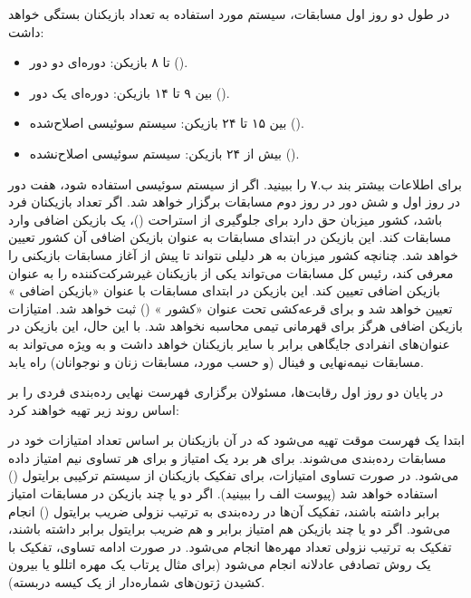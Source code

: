 
در طول دو روز اول مسابقات، سیستم مورد استفاده به تعداد بازیکنان بستگی خواهد داشت:

\begin{itemize}
  \item تا ۸ بازیکن: دوره‌ای دو دور ().
  \item بین ۹ تا ۱۴ بازیکن: دوره‌ای یک دور ().
  \item بین ۱۵ تا ۲۴ بازیکن: سیستم سوئیسی اصلاح‌شده ().
  \item بیش از ۲۴ بازیکن: سیستم سوئیسی اصلاح‌نشده ().
\end{itemize}

برای اطلاعات بیشتر بند ب.۷ را ببینید. اگر از سیستم سوئیسی استفاده شود، هفت دور در روز اول و شش دور در روز دوم مسابقات برگزار خواهد شد. اگر تعداد بازیکنان فرد باشد، کشور میزبان حق دارد برای جلوگیری از استراحت ()، یک بازیکن اضافی وارد مسابقات کند. این بازیکن در ابتدای مسابقات به عنوان بازیکن اضافی آن کشور تعیین خواهد شد. چنانچه کشور میزبان به هر دلیلی نتواند تا پیش از آغاز مسابقات بازیکنی را معرفی کند، رئیس کل مسابقات می‌تواند یکی از بازیکنان غیرشرکت‌کننده را به عنوان بازیکن اضافی تعیین کند. این بازیکن در ابتدای مسابقات با عنوان «بازیکن اضافی » تعیین خواهد شد و برای قرعه‌کشی تحت عنوان «کشور » () ثبت خواهد شد. امتیازات بازیکن اضافی هرگز برای قهرمانی تیمی محاسبه نخواهد شد. با این حال، این بازیکن در عنوان‌های انفرادی جایگاهی برابر با سایر بازیکنان خواهد داشت و به ویژه می‌تواند به مسابقات نیمه‌نهایی و فینال (و حسب مورد، مسابقات زنان و نوجوانان) راه یابد.


در پایان دو روز اول رقابت‌ها، مسئولان برگزاری فهرست نهایی رده‌بندی فردی را بر اساس روند زیر تهیه خواهند کرد:


ابتدا یک فهرست موقت تهیه می‌شود که در آن بازیکنان بر اساس تعداد امتیازات خود در مسابقات رده‌بندی می‌شوند. برای هر برد یک امتیاز و برای هر تساوی نیم امتیاز داده می‌شود. در صورت تساوی امتیازات، برای تفکیک بازیکنان از سیستم ترکیبی برایتول () استفاده خواهد شد (پیوست الف را ببینید). اگر دو یا چند بازیکن در مسابقات امتیاز برابر داشته باشند، تفکیک آن‌ها در رده‌بندی به ترتیب نزولی ضریب برایتول () انجام می‌شود. اگر دو یا چند بازیکن هم امتیاز برابر و هم ضریب برایتول برابر داشته باشند، تفکیک به ترتیب نزولی تعداد مهره‌ها انجام می‌شود. در صورت ادامه تساوی، تفکیک با یک روش تصادفی عادلانه انجام می‌شود (برای مثال پرتاب یک مهره اتللو یا بیرون کشیدن ژتون‌های شماره‌دار از یک کیسه دربسته).

